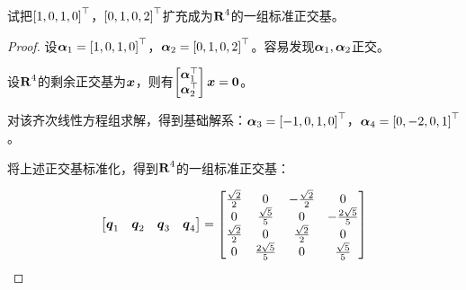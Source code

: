 \begin{problem}
试把\(\left[ 1,0,1,0 \right]^\top\)，\(\left[ 0,1,0,2 \right]^\top\)扩充成为\(\boldsymbol{\mathrm{R}}^4\)的一组标准正交基。
\end{problem}
\begin{proof}
    设\(\boldsymbol{\alpha}_1=\left[ 1,0,1,0 \right]^\top\)，\(\boldsymbol{\alpha}_2=\left[ 0,1,0,2 \right]^\top\)。容易发现\(\boldsymbol{\alpha}_1,\boldsymbol{\alpha}_2\)正交。

    设\(\boldsymbol{\mathrm{R}}^4\)的剩余正交基为\(\boldsymbol{x}\)，则有\(\begin{bmatrix}\boldsymbol{\alpha}_1^\top\\\boldsymbol{\alpha}_2^\top\end{bmatrix}\boldsymbol{x}=\boldsymbol{0}\)。

    对该齐次线性方程组求解，得到基础解系：\(\boldsymbol{\alpha}_3=\left[ -1,0,1,0 \right]^\top\)，\(\boldsymbol{\alpha}_4=\left[ 0,-2,0,1 \right]^\top\)。

    将上述正交基标准化，得到\(\boldsymbol{\mathrm{R}}^4\)的一组标准正交基：

    \begin{equation*}
        \begin{bmatrix}
            \boldsymbol{q}_1 & \boldsymbol{q}_2 & \boldsymbol{q}_3 & \boldsymbol{q}_4
        \end{bmatrix}=
        \begin{bmatrix}
            \frac{\sqrt{2}}{2} & 0                   & -\frac{\sqrt{2}}{2} & 0                    \\
            0                  & \frac{\sqrt{5}}{5}  & 0                   & -\frac{2\sqrt{5}}{5} \\
            \frac{\sqrt{2}}{2} & 0                   & \frac{\sqrt{2}}{2}  & 0                    \\
            0                  & \frac{2\sqrt{5}}{5} & 0                   & \frac{\sqrt{5}}{5}
        \end{bmatrix}
    \end{equation*}
\end{proof}

